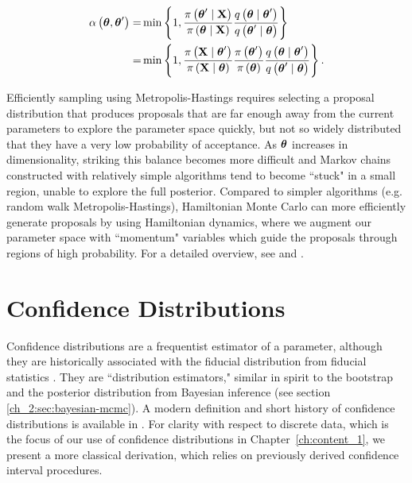 \begin{align}
\alpha \left( \boldsymbol{\theta}, \boldsymbol{\theta}^\prime \right)   =&   \min \left\{ 1, \frac{\pi \left( \boldsymbol{\theta}^\prime \mid \mathbf{X} \right)}{\pi \left( \boldsymbol{\theta} \mid \mathbf{X} \right)} \frac{q \left( \boldsymbol{\theta} \mid \boldsymbol{\theta}^\prime \right)}{q \left( \boldsymbol{\theta}^\prime \mid \boldsymbol{\theta}  \right)} \right\}    \\
=&  \min \left\{ 1, \frac{\pi \left( \mathbf{X} \mid \boldsymbol{\theta}^\prime  \right)}{\pi \left( \mathbf{X} \mid \boldsymbol{\theta} \right)} \frac{\pi \left( \boldsymbol{\theta}^\prime \right)}{\pi \left( \boldsymbol{\theta} \right)} \frac{q \left( \boldsymbol{\theta} \mid \boldsymbol{\theta}^\prime \right)}{q \left( \boldsymbol{\theta}^\prime \mid \boldsymbol{\theta}  \right)} \right\}.
\end{align}

Efficiently sampling using Metropolis-Hastings requires selecting a proposal distribution that produces proposals that are far enough away from the current parameters to explore the parameter space quickly, but not so widely distributed that they have a very low probability of acceptance.
As \( \boldsymbol{\theta} \) increases in dimensionality, striking this balance becomes more difficult and Markov chains constructed with relatively simple algorithms tend to become ``stuck" in a small region, unable to explore the full posterior.
Compared to simpler algorithms (e.g. random walk Metropolis-Hastings), Hamiltonian Monte Carlo can more efficiently generate proposals by using Hamiltonian dynamics, where we augment our parameter space with ``momentum" variables which guide the proposals through regions of high probability.
For a detailed overview, see \citet{betancourt2018conceptual} and \citet{neal2011mcmc}.

\section{Confidence Distributions}
\label{ch_2:sec:confidence_distributions}
Confidence distributions are a frequentist estimator of a parameter, although they are historically associated with the fiducial distribution from fiducial statistics \citep{Xie2013}.
They are ``distribution estimators," similar in spirit to the bootstrap and the posterior distribution from Bayesian inference (see section \ref{ch_2:sec:bayesian-mcmc}).
A modern definition and short history of confidence distributions is available in \citet{Xie2013}.
For clarity with respect to discrete data, which is the focus of our use of confidence distributions in Chapter~\ref{ch:content_1}, we present a more classical derivation, which relies on previously derived confidence interval procedures.

